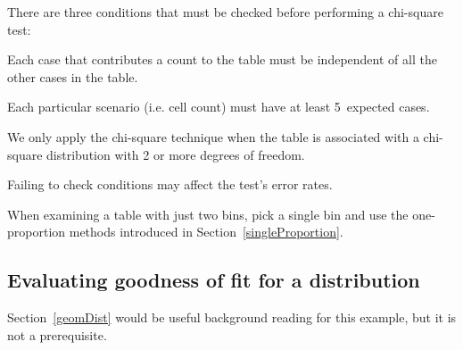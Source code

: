\begin{tipBox}{
There are three conditions that must be checked before performing a chi-square test:\vspace{-1mm}
\begin{description}
\setlength{\itemsep}{0mm}
\item[Independence.] Each case that contributes a count to the table must be independent of all the other cases in the table.
\item[Sample size / distribution.] Each particular scenario (i.e. cell count) must have at least 5~expected cases.
\item[Degrees of freedom] We only apply the chi-square technique when the table is associated with a chi-square distribution with 2 or more degrees of freedom. \vspace{-1mm}
\end{description}
Failing to check conditions may affect the test's error rates.}
\end{tipBox}

When examining a table with just two bins, pick a single bin and use the one-proportion methods introduced in Section~\ref{singleProportion}.


\subsection{Evaluating goodness of fit for a distribution}

Section~\ref{geomDist} would be useful background reading for this example, but it is not a prerequisite.


